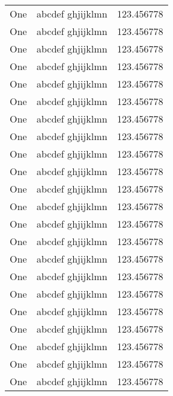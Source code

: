 \begin{landscape}
\begin{center}
\begin{supertabular}{| r @{\quad -sep- }| r@{\hspace{6 cm}}| r |}
One & abcdef ghjijklmn & 123.456778 \\
One & abcdef ghjijklmn & 123.456778 \\
One & abcdef ghjijklmn & 123.456778 \\
One & abcdef ghjijklmn & 123.456778 \\
One & abcdef ghjijklmn & 123.456778 \\
One & abcdef ghjijklmn & 123.456778 \\
One & abcdef ghjijklmn & 123.456778 \\
One & abcdef ghjijklmn & 123.456778 \\
One & abcdef ghjijklmn & 123.456778 \\
One & abcdef ghjijklmn & 123.456778 \\
One & abcdef ghjijklmn & 123.456778 \\
One & abcdef ghjijklmn & 123.456778 \\
One & abcdef ghjijklmn & 123.456778 \\
One & abcdef ghjijklmn & 123.456778 \\
One & abcdef ghjijklmn & 123.456778 \\
One & abcdef ghjijklmn & 123.456778 \\
One & abcdef ghjijklmn & 123.456778 \\
One & abcdef ghjijklmn & 123.456778 \\
One & abcdef ghjijklmn & 123.456778 \\
One & abcdef ghjijklmn & 123.456778 \\
One & abcdef ghjijklmn & 123.456778 \\
One & abcdef ghjijklmn & 123.456778 \\


\end{supertabular} 

\end{center}
\end{landscape}